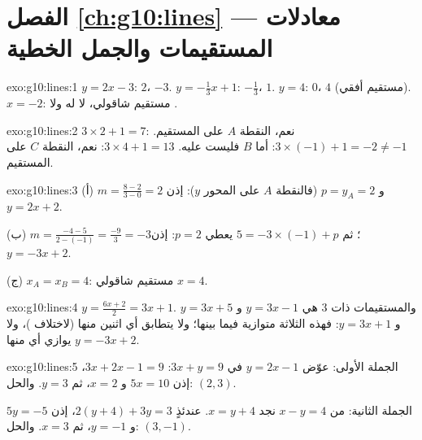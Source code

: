 \section*{الفصل \ref{ch:g10:lines} --- معادلات المستقيمات والجمل الخطية}

\begin{solution}{exo:g10:lines:1}
$y = 2x - 3$:  $2$،  $-3$.
$y = -\frac13 x + 1$:  $-\frac13$،  $1$.
$y = 4$:  $0$،  $4$ (مستقيم أفقي).
$x = -2$: مستقيم شاقولي، لا  له ولا .
\end{solution}

\begin{solution}{exo:g10:lines:2}
$3 \times 2 + 1 = 7$: نعم، النقطة $A$ على المستقيم.
$3 \times (-1) + 1 = -2 \neq -1$: أما $B$ فليست عليه.
$3 \times 4 + 1 = 13$: نعم، النقطة $C$ على المستقيم.
\end{solution}

\begin{solution}{exo:g10:lines:3}
(أ) $m = \frac{8 - 2}{3 - 0} = 2$ و $p = y_A = 2$ (فالنقطة $A$ على
المحور $y$): إذن $y = 2x + 2$.

(ب) $m = \frac{-4 - 5}{2 - (-1)} = \frac{-9}{3} = -3$؛ ثم
$5 = -3 \times (-1) + p$ يعطي $p = 2$: إذن $y = -3x + 2$.

(ج) $x_A = x_B = 4$: مستقيم شاقولي $x = 4$.
\end{solution}

\begin{solution}{exo:g10:lines:4}
$y = \frac{6x+2}{2} = 3x + 1$. والمستقيمات ذات  $3$ هي $y = 3x - 1$ و
$y = 3x + 5$ و $y = 3x + 1$: فهذه الثلاثة متوازية فيما بينها؛
ولا يتطابق أي اثنين منها (لاختلاف )، ولا يوازي أي منها
$y = -3x + 2$.
\end{solution}

\begin{solution}{exo:g10:lines:5}
الجملة الأولى: عوّض $y = 2x - 1$ في $3x + y = 9$:
$3x + 2x - 1 = 9$، إذن $5x = 10$ و $x = 2$، ثم $y = 3$. والحل:
$(2, 3)$.

الجملة الثانية: من $x - y = 4$ نجد $x = y + 4$. عندئذٍ
$2(y + 4) + 3y = 3$، إذن $5y = -5$ و $y = -1$، ثم $x = 3$. والحل:
$(3, -1)$.
\end{solution}

